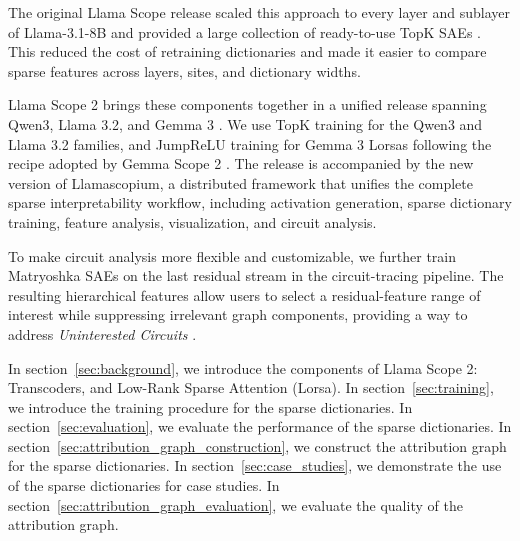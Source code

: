 \documentclass{article}
\begin{document}
The original Llama Scope release scaled this approach to every
layer and sublayer of Llama-3.1-8B and provided a large collection of
ready-to-use TopK SAEs \citep{he2024llamascope}. This reduced the cost of
retraining dictionaries and made it easier to compare sparse features across
layers, sites, and dictionary widths.

Llama Scope 2 brings these components together in a unified release spanning Qwen3, Llama 3.2, and 
Gemma 3 \citep{deng2026qwenscope, mcdougall2025gemmascope2}. We use TopK training for the Qwen3 and Llama 3.2 families, 
and JumpReLU training for Gemma 3 Lorsas following the recipe adopted by Gemma Scope 2 \citep{mcdougall2025gemmascope2}. 
The release is accompanied by the new version of Llamascopium, a distributed framework that unifies the complete sparse 
interpretability workflow, including activation generation, sparse dictionary training, feature analysis, visualization, and circuit analysis.

To make circuit analysis more flexible and customizable, we further train
Matryoshka SAEs \citep{bussmann2025matryoshka} on the last residual stream in the circuit-tracing pipeline.
The resulting hierarchical features allow users to select a residual-feature range of interest while suppressing 
irrelevant graph components, providing a way to address \emph{Uninterested Circuits} \citep{shu2026completereplacement}.

In section~\ref{sec:background}, we introduce the components of Llama Scope 2: Transcoders, and Low-Rank Sparse Attention (Lorsa).
In section~\ref{sec:training}, we introduce the training procedure for the sparse dictionaries.
In section~\ref{sec:evaluation}, we evaluate the performance of the sparse dictionaries.
In section~\ref{sec:attribution_graph_construction}, we construct the attribution graph for the sparse dictionaries.
In section~\ref{sec:case_studies}, we demonstrate the use of the sparse dictionaries for case studies.
In section~\ref{sec:attribution_graph_evaluation}, we evaluate the quality of the attribution graph.
\end{document}
